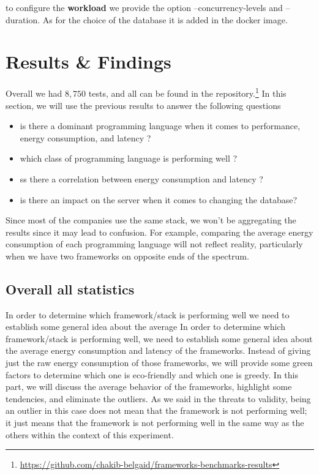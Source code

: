 to configure the \textbf{workload} we provide the option --concurrency-levels and --duration.
As for the choice of the database it is added in the docker image.


\section{Results \& Findings}
Overall we had $8,750$ tests, and all can be found in the repository.\footnote{\url{https://github.com/chakib-belgaid/frameworks-benchmarks-results}}
In this section, we will use the previous results to answer the following questions
\begin{itemize}
    \item is there a dominant programming language when it comes to performance, energy consumption, and latency ?
    \item which class of programming language is performing well ?
    \item ss there a correlation between energy consumption and latency ?
    \item is there an impact on the server when it comes to changing the database?
\end{itemize}

Since most of the companies use the same stack, we won't be aggregating the results since it may lead to confusion.
For example, comparing the average energy consumption of each programming language will not reflect reality, particularly when we have two frameworks on opposite ends of the spectrum.

\subsection{Overall all statistics}
In order to determine which framework/stack is performing well we need to establish some general idea about the average In order to determine which framework/stack is performing well, we need to establish some general idea about the average energy consumption and latency of the frameworks. Instead of giving just the raw energy consumption of those frameworks, we will provide some green factors to determine which one is eco-friendly and which one is greedy.
In this part, we will discuss the average behavior of the frameworks, highlight some tendencies, and eliminate the outliers.
As we said in the threats to validity, being an outlier in this case does not mean that the framework is not performing well; it just means that the framework is not performing well in the same way as the others within the context of this experiment.

